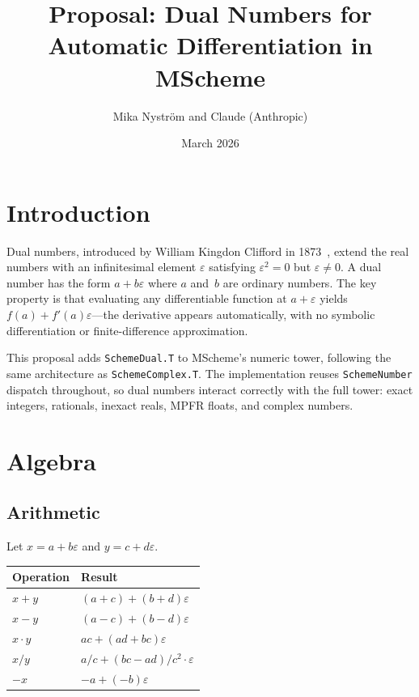 \documentclass[12pt]{report}
\title{\bfseries\sffamily Proposal: Dual Numbers for\\Automatic Differentiation in MScheme}
\author{Mika Nystr\"om and Claude (Anthropic)}
\date{March 2026}
\begin{document}
\maketitle
\tableofcontents

\chapter{Introduction}

Dual numbers, introduced by William Kingdon Clifford in
1873~\cite{clifford1873}, extend the real numbers with an
infinitesimal element $\varepsilon$ satisfying $\varepsilon^2 = 0$
but $\varepsilon \neq 0$.  A dual number has the form
$a + b\varepsilon$ where $a$ and~$b$ are ordinary numbers.  The
key property is that evaluating any differentiable function at
$a + \varepsilon$ yields $f(a) + f'(a)\varepsilon$---the derivative
appears automatically, with no symbolic differentiation or
finite-difference approximation.

This proposal adds {\tt SchemeDual.T} to MScheme's numeric tower,
following the same architecture as {\tt SchemeComplex.T}.  The
implementation reuses {\tt SchemeNumber} dispatch throughout, so dual
numbers interact correctly with the full tower: exact integers,
rationals, inexact reals, MPFR floats, and complex numbers.

\chapter{Algebra}

\section{Arithmetic}

Let $x = a + b\varepsilon$ and $y = c + d\varepsilon$.

\begin{center}
\begin{tabular}{ll}
\toprule
Operation & Result \\
\midrule
$x + y$   & $(a + c) + (b + d)\varepsilon$ \\
$x - y$   & $(a - c) + (b - d)\varepsilon$ \\
$x \cdot y$ & $ac + (ad + bc)\varepsilon$ \\
$x / y$   & $a/c + (bc - ad)/c^2 \cdot \varepsilon$ \\
$-x$      & $-a + (-b)\varepsilon$ \\
\bottomrule
\end{tabular}
\end{center}
\end{document}
